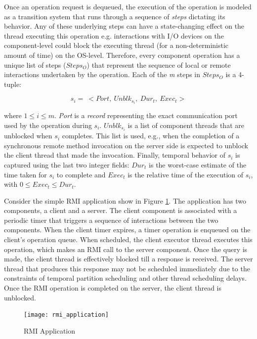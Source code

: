 Once an operation request is dequeued, the execution of the operation is modeled as a transition system that runs through a sequence of \emph{steps} dictating its behavior. Any of these underlying steps can have a state-changing effect on the thread executing this operation e.g. interactions with I/O devices on the component-level could block the executing thread (for a non-deterministic amount of time) on the OS-level. Therefore, every component operation has a unique list of steps ($Steps_O$) that represent the sequence of local or remote interactions undertaken by the operation. Each of the \emph{m} steps in $Steps_O$ is a 4-tuple:

\begin{equation}
s_i = \ <Port, \ Unblk_{s_i}, \ Dur_t, \ Exec_t>
\end{equation}

where $1 \le i \le m$. \emph{Port} is a \emph{record} representing the exact communication port used by the operation during $s_i$. $Unblk_{s_i}$ is a list of component threads that are unblocked when $s_i$ completes. This list is used, e.g., when the completion of a synchronous remote method invocation on the server side is expected to unblock the client thread that made the invocation. Finally, temporal behavior of $s_i$ is captured using the last two integer fields: \emph{$Dur_t$} is the worst-case estimate of the time taken for $s_i$ to complete and $Exec_t$ is the relative time of the execution of $s_i$, with $0 \le Exec_t \le Dur_t$.

Consider the simple RMI application show in Figure \ref{fig:rmi_application}. The application has two components, a client and a server. The client component is associated with a periodic timer that triggers a sequence of interactions between the two components. When the client timer expires, a timer operation is enqueued on the client's operation queue. When scheduled, the client executor thread executes this operation, which makes an RMI call to the server component. Once the query is made, the client thread is effectively blocked till a response is received. The server thread that produces this response may not be scheduled immediately due to the constraints of temporal partition scheduling and other thread scheduling delays. Once the RMI operation is completed on the server, the client thread is unblocked. 

\begin{figure}[ht]
	\centering
	\texttt{[image: rmi\_application]}
	\caption{RMI Application}
	\label{fig:rmi_application}
\end{figure}


